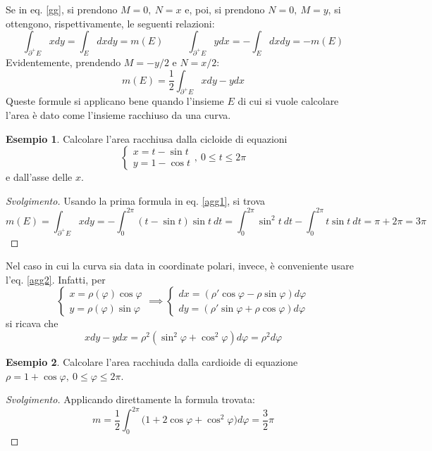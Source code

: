 \documentclass[10pt, a4paper]{scrartcl}
\newenvironment{svolgimento}{\renewcommand\qedsymbol{$\blacksquare$}\begin{proof}[Svolgimento]}{\end{proof}}
\theoremstyle{definition}
\newtheorem{esempio}{Esempio}
\numberwithin{esempio}{section}
\theoremstyle{definition}
\numberwithin{obs}{section}
\numberwithin{nota}{section}
\numberwithin{equation}{subsection}
\begin{document}
Se in eq. \ref{gg}, si prendono $M = 0, \ N = x$ e, poi, si prendono $N= 0 , \ M = y$, si ottengono, rispettivamente, le seguenti relazioni:
\begin{equation}\label{agg1}
	\int_{\partial ^+E } xdy = \int_{E} dxdy = m(E) \hspace{1cm} \int_{\partial ^+ E } ydx = - \int_{E} dxdy  = -  m(E)
\end{equation}
Evidentemente, prendendo $M = - y / 2$ e $N = x / 2$:
\begin{equation}\label{agg2}
	m(E) =  \frac{1}{ 2} \int_{\partial ^+ E } x dy - y dx
\end{equation}
Queste formule si applicano bene quando l'insieme $E$ di cui si vuole calcolare l'area \`e dato come l'insieme racchiuso da una curva.

\begin{esempio}
Calcolare l'area racchiusa dalla cicloide di equazioni
\[
\begin{cases}
	x = t - \sin t \\
	y = 1 - \cos t
\end{cases},  \ 0\le t\le 2 \pi
\] 
e dall'asse delle $x$.
\begin{svolgimento}
	Usando la prima formula in eq. \ref{agg1}, si trova
	\[
	m(E) = \int_{\partial ^+E} xdy =  - \int_{0} ^{2\pi} (t-\sin t ) \sin t \ dt  = \int_{0} ^{2\pi} \sin^2 t \ dt - \int_{0} ^{2\pi} t \sin t \ dt = \pi + 2\pi = 3 \pi 
	\] 
\end{svolgimento}
\end{esempio}
Nel caso in cui la curva sia data in coordinate polari, invece, \`e conveniente usare l'eq. \ref{agg2}.
Infatti, per
\[
\begin{cases}
	x = \rho (\varphi ) \cos  \varphi \\
	y = \rho (\varphi ) \sin \varphi 
\end{cases}\implies \begin{cases}
	dx = (\rho '\cos\varphi  - \rho  \sin \varphi ) d\varphi \\
	dy = (\rho ' \sin  \varphi  + \rho \cos \varphi ) d\varphi 
\end{cases}
\] 
si ricava che
\begin{equation}
xdy - ydx = \rho ^2 (\sin ^2 \varphi  + \cos ^2 \varphi )d\varphi  = \rho ^2 d\varphi 
\end{equation}
\begin{esempio}
Calcolare l'area racchiuda dalla cardioide di equazione $\rho = 1 + \cos \varphi , \ 0\le \varphi \le 2\pi$.
\begin{svolgimento}
	Applicando direttamente la formula trovata:
	\[
	m = \frac{1}{2}\int_{0} ^{2\pi} \big(1 + 2 \cos \varphi  + \cos^2 \varphi  \big) d\varphi = \frac{3}{2}\pi
	\] 
\end{svolgimento}
\end{esempio}
\end{document}
